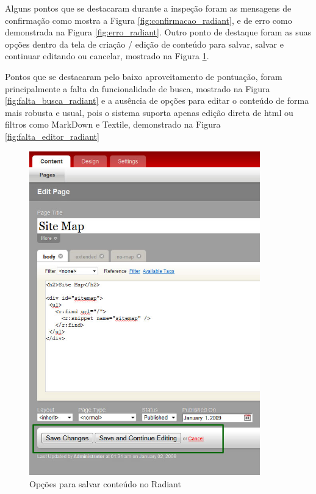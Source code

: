Alguns pontos que se destacaram durante a inspeção foram as mensagens de confirmação como mostra a Figura \ref{fig:confirmacao_radiant},  e de erro como demonstrada na Figura \ref{fig:erro_radiant}. Outro ponto de destaque foram as suas opções dentro da tela de criação / edição de conteúdo para salvar, salvar e continuar editando ou cancelar, mostrado na Figura \ref{fig:salvar_radiant}.

Pontos que se destacaram pelo baixo aproveitamento de pontuação, foram principalmente a falta da funcionalidade de busca, mostrado na Figura \ref{fig:falta_busca_radiant} e a ausência de opções para editar o conteúdo de forma mais robusta e usual, pois o sistema suporta apenas edição direta de html ou filtros como MarkDown e Textile, demonstrado na Figura \ref{fig:falta_editor_radiant} 

\begin{figure}[here]
\includegraphics[width=100mm]{images/radiant_ponto_opcoes.jpg}
\caption{Opções para salvar conteúdo no Radiant }
\label{fig:salvar_radiant}
\end{figure}

